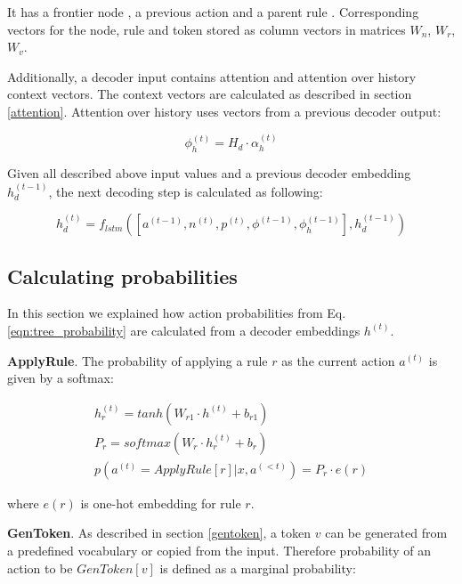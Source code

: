 It has a frontier node , a previous action  and a parent rule . Corresponding vectors for the node, rule and token stored as column vectors in matrices $W_n$, $W_r$, $W_v$.

Additionally, a decoder input contains attention and attention over history context vectors. The context vectors are calculated as described in section \ref{attention}. Attention over history uses vectors from a previous decoder output:

\begin{equation}
    \phi_h^{(t)} = H_d\cdot\alpha_h^{(t)}
\end{equation}

Given all described above input values and a previous decoder embedding $h_d^{(t-1)}$, the next decoding step is calculated as following:

\begin{equation}
    h_d^{(t)}=f_{lstm}([a^{(t-1)}, n^{(t)}, p^{(t)}, \phi^{(t-1)}, \phi_h^{(t-1)}], h_d^{(t-1)})
\end{equation}

\subsection{Calculating probabilities}
In this section we explained how action probabilities from Eq. \ref{eqn:tree_probability} are calculated from a decoder embeddings $h^{(t)}$.

\textbf{ApplyRule}. The probability of applying a rule $r$ as the current action $a^{(t)}$ is given by a softmax:

\begin{equation}
\begin{gathered}
    h^{(t)}_r = tanh(W _{r1}\cdot h^{(t)} + b_{r1}) \\
    P_r = softmax(W_r\cdot h^{(t)}_r  + b_r) \\
    p(a^{(t)} = ApplyRule[r]|x,a^{(<t)}) = P_r\cdot e(r)
\end{gathered}
\label{eqn:apply_rule}
\end{equation}

where $e(r)$ is one-hot embedding for rule $r$.

\textbf{GenToken}. As described in section \ref{gentoken}, a token $v$ can be generated from a predefined vocabulary or copied from the input. Therefore probability of an action to be $GenToken[v]$ is defined as a marginal probability:
    
